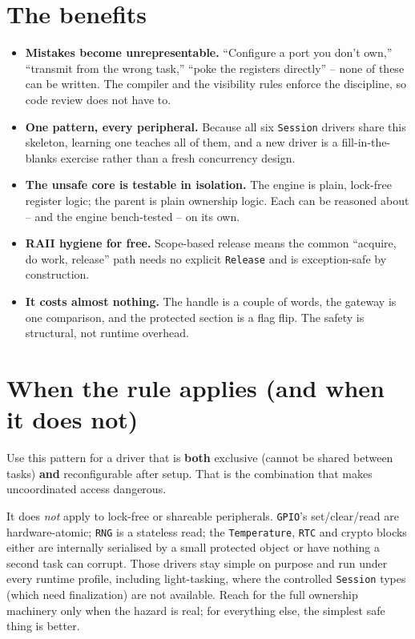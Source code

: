 \section{The benefits}

\begin{itemize}
\item \textbf{Mistakes become unrepresentable.} ``Configure a port you don't
  own,'' ``transmit from the wrong task,'' ``poke the registers directly'' --
  none of these can be written. The compiler and the visibility rules enforce
  the discipline, so code review does not have to.
\item \textbf{One pattern, every peripheral.} Because all six \texttt{Session}
  drivers share this skeleton, learning one teaches all of them, and a new driver
  is a fill-in-the-blanks exercise rather than a fresh concurrency design.
\item \textbf{The unsafe core is testable in isolation.} The engine is plain,
  lock-free register logic; the parent is plain ownership logic. Each can be
  reasoned about -- and the engine bench-tested -- on its own.
\item \textbf{RAII hygiene for free.} Scope-based release means the common
  ``acquire, do work, release'' path needs no explicit \texttt{Release} and is
  exception-safe by construction.
\item \textbf{It costs almost nothing.} The handle is a couple of words, the
  gateway is one comparison, and the protected section is a flag flip. The safety
  is structural, not runtime overhead.
\end{itemize}

\section{When the rule applies (and when it does not)}

Use this pattern for a driver that is \textbf{both} exclusive (cannot be shared
between tasks) \textbf{and} reconfigurable after setup. That is the combination
that makes uncoordinated access dangerous.

It does \emph{not} apply to lock-free or shareable peripherals. \texttt{GPIO}'s
set/clear/read are hardware-atomic; \texttt{RNG} is a stateless read; the
\texttt{Temperature}, \texttt{RTC} and crypto blocks either are internally
serialised by a small protected object or have nothing a second task can corrupt.
Those drivers stay simple on purpose and run under every runtime profile,
including light-tasking, where the controlled \texttt{Session} types (which need
finalization) are not available. Reach for the full ownership machinery only when
the hazard is real; for everything else, the simplest safe thing is better.

